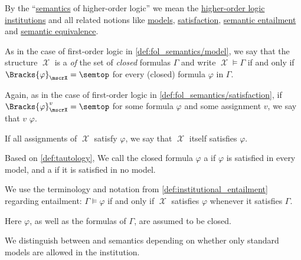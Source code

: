 \begin{definition}\label{def:hol_semantics}\mimprovised
  By the \enquote{\hyperref[con:syntax_semantics_duality]{semantics} of higher-order logic} we mean the \hyperref[def:hol_institution]{higher-order logic institutions} and all related notions like \hyperref[def:institution/models]{models}, \hyperref[def:institution/satisfaction]{satisfaction}, \hyperref[def:institutional_entailment]{semantic entailment} and \hyperref[def:semantic_equivalence]{semantic equivalence}.

  \begin{thmenum}
     As in the case of first-order logic in \cref{def:fol_semantics/model}, we say that the structure \( \mscrX \) is a  \emph{of} the set of \emph{closed} formulas \( \Gamma \) and write \( \mscrX \vDash \Gamma \) if and only if \( \Bracks{\varphi}_\mscrX = \semtop \) for every (closed) formula \( \varphi \) in \( \Gamma \).

     Again, as in the case of first-order logic in \cref{def:fol_semantics/satisfaction}, if \( \Bracks{\varphi}_\mscrX^v = \semtop \) for some formula \( \varphi \) and some assignment \( v \), we say that \( v \)  \( \varphi \).

    If all assignments of \( \mscrX \) satisfy \( \varphi \), we say that \( \mscrX \) itself satisfies \( \varphi \).

     Based on \cref{def:tautology}, We call the closed formula \( \varphi \) a  if \( \varphi \) is satisfied in every model, and a  if it is satisfied in no model.

     We use the terminology and notation from \cref{def:institutional_entailment} regarding entailment: \( \Gamma \vDash \varphi \) if and only if \( \mscrX \) satisfies \( \varphi \) whenever it satisfies \( \Gamma \).

    Here \( \varphi \), as well as the formulas of \( \Gamma \), are assumed to be closed.

     We distinguish between  and  semantics depending on whether only standard models are allowed in the institution.
  \end{thmenum}
\end{definition}

